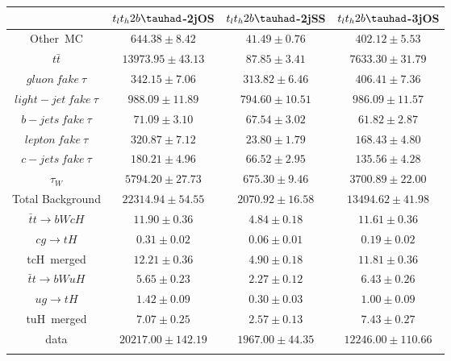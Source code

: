 \centering
\begin{tabular}{cccc} \toprule\toprule
 & $t_{l}t_{h}2b\tauhad$-2jOS & $t_{l}t_{h}2b\tauhad$-2jSS & $t_{l}t_{h}2b\tauhad$-3jOS \\\midrule
Other~MC & $644.38\pm8.42$ & $41.49\pm0.76$ & $402.12\pm5.53$ \\
$t\bar{t}$ & $13973.95\pm43.13$ & $87.85\pm3.41$ & $7633.30\pm31.79$\\
$gluon~fake~\tau$ & $342.15\pm7.06$ & $313.82\pm6.46$ & $406.41\pm7.36$\\
$light-jet~fake~\tau$ & $988.09\pm11.89$ & $794.60\pm10.51$ & $986.09\pm11.57$\\
$b-jets~fake~\tau$ & $71.09\pm3.10$ & $67.54\pm3.02$ & $61.82\pm2.87$\\
$lepton~fake~\tau$ & $320.87\pm7.12$ & $23.80\pm1.79$ & $168.43\pm4.80$\\
$c-jets~fake~\tau$ & $180.21\pm4.96$ & $66.52\pm2.95$ & $135.56\pm4.28$\\
$\tau_{W}$ & $5794.20\pm27.73$ & $675.30\pm9.46$ & $3700.89\pm22.00$\\\midrule
Total Background & $22314.94\pm54.55$ & $2070.92\pm16.58$ & $13494.62\pm41.98$\\\midrule\midrule
$\bar{t}t\to bWcH$ & $11.90\pm0.36$ & $4.84\pm0.18$ & $11.61\pm0.36$\\
$cg\to tH$ & $0.31\pm0.02$ & $0.06\pm0.01$ & $0.19\pm0.02$\\
tcH~merged & $12.21\pm0.36$ & $4.90\pm0.18$ & $11.81\pm0.36$\\\midrule
$\bar{t}t\to bWuH$ & $5.65\pm0.23$ & $2.27\pm0.12$ & $6.43\pm0.26$\\
$ug\to tH$ & $1.42\pm0.09$ & $0.30\pm0.03$ & $1.00\pm0.09$\\
tuH~merged & $7.07\pm0.25$ & $2.57\pm0.13$ & $7.43\pm0.27$\\\midrule\midrule
data & $20217.00\pm142.19$ & $1967.00\pm44.35$ & $12246.00\pm110.66$\\
\bottomrule\bottomrule\\
\end{tabular}

